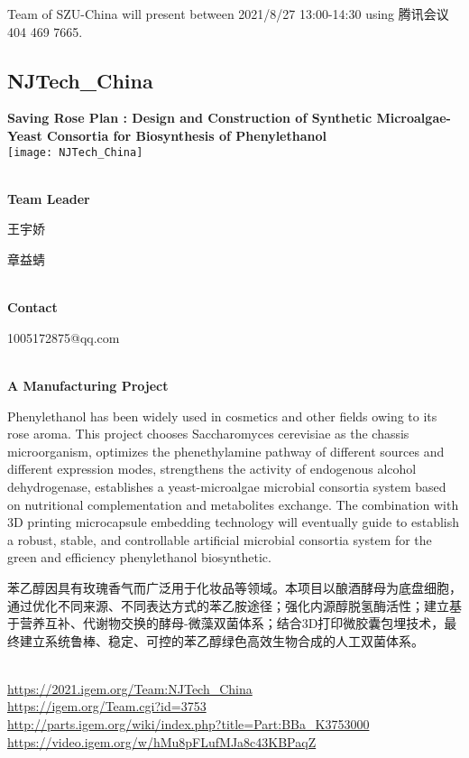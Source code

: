 Team of SZU-China will present between 2021/8/27 13:00-14:30        using 腾讯会议 404 469 7665.
\newpage


\subsection{\textcolor{Blu}{ NJTech\_China } }
\vspace{5mm}
\begin{center}
\large{
  \textbf{ Saving Rose Plan : Design and Construction of Synthetic Microalgae-Yeast Consortia for Biosynthesis of Phenylethanol }\\
  \texttt{[image: NJTech\_China]}
}
\end{center}
\textbf{\\Team Leader}

  王宇娇

  章益蜻


\textbf{\\Contact}

  1005172875@qq.com


\textbf{\\A Manufacturing Project\\}\begin{spacing}{1.5}

Phenylethanol has been widely used in cosmetics and other fields owing to its rose aroma. This project chooses Saccharomyces cerevisiae as the chassis microorganism, optimizes the phenethylamine pathway of different sources and different expression modes, strengthens the activity of endogenous alcohol dehydrogenase, establishes a yeast-microalgae microbial consortia system based on nutritional complementation and metabolites exchange. The combination with 3D printing microcapsule embedding technology will eventually guide to establish a robust, stable, and controllable artificial microbial consortia system for the green and efficiency phenylethanol biosynthetic.

苯乙醇因具有玫瑰香气而广泛用于化妆品等领域。本项目以酿酒酵母为底盘细胞，通过优化不同来源、不同表达方式的苯乙胺途径；强化内源醇脱氢酶活性；建立基于营养互补、代谢物交换的酵母-微藻双菌体系；结合3D打印微胶囊包埋技术，最终建立系统鲁棒、稳定、可控的苯乙醇绿色高效生物合成的人工双菌体系。\end{spacing}
\\

\url{https://2021.igem.org/Team:NJTech\_China }\\
\url{https://igem.org/Team.cgi?id=3753 }\\
\url{http://parts.igem.org/wiki/index.php?title=Part:BBa_K3753000 }\\
\url{https://video.igem.org/w/hMu8pFLufMJa8c43KBPaqZ }\\


